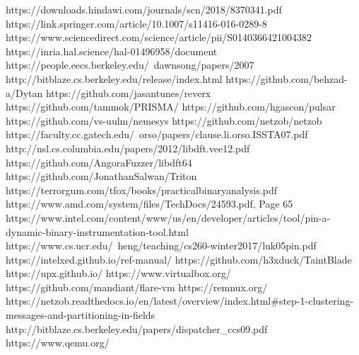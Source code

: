 \documentclass[conference]{IEEEtran}
\begin{document}
\newpage
\begin{thebibliography}{00}
     https://downloads.hindawi.com/journals/scn/2018/8370341.pdf
     https://link.springer.com/article/10.1007/s11416-016-0289-8
     https://www.sciencedirect.com/science/article/pii/S0140366421004382
     https://inria.hal.science/hal-01496958/document
     https://people.eecs.berkeley.edu/~dawnsong/papers/2007%
     http://bitblaze.cs.berkeley.edu/release/index.html
     https://github.com/behzad-a/Dytan
     https://github.com/jasantunes/reverx
     https://github.com/tammok/PRISMA/
     https://github.com/hgascon/pulsar
     https://github.com/vs-uulm/nemesys
     https://github.com/netzob/netzob
     https://faculty.cc.gatech.edu/~orso/papers/clause.li.orso.ISSTA07.pdf
     http://nsl.cs.columbia.edu/papers/2012/libdft.vee12.pdf
     https://github.com/AngoraFuzzer/libdft64
     https://github.com/JonathanSalwan/Triton
     https://terrorgum.com/tfox/books/practicalbinaryanalysis.pdf
     https://www.amd.com/system/files/TechDocs/24593.pdf, Page 65
     https://www.intel.com/content/www/us/en/developer/articles/tool/pin-a-dynamic-binary-instrumentation-tool.html
     https://www.cs.ucr.edu/~heng/teaching/cs260-winter2017/luk05pin.pdf
     https://intelxed.github.io/ref-manual/
     https://github.com/h3xduck/TaintBlade
     https://upx.github.io/
     https://www.virtualbox.org/
     https://github.com/mandiant/flare-vm
     https://remnux.org/
     https://netzob.readthedocs.io/en/latest/overview/index.html\#step-1-clustering-messages-and-partitioning-in-fields
     http://bitblaze.cs.berkeley.edu/papers/dispatcher\_ccs09.pdf
     https://www.qemu.org/

\end{thebibliography}
\vspace{12pt}
\end{document}
